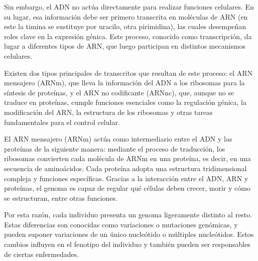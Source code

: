 \documentclass[11pt,spanish,listoffigures,listoftables]{tfgetsinf}
\begin{document}
Sin embargo, el ADN no actúa directamente para realizar funciones celulares. En su lugar, esa información debe ser primero transcrita en moléculas de ARN (en este la timina se sustituye por uracilo, otra pirimidina), las cuales desempeñan roles clave en la expresión génica. Este proceso, conocido como transcripción, da lugar a diferentes tipos de ARN, que luego participan en distintos mecanismos celulares.

Existen dos tipos principales de transcritos que resultan de este proceso: el ARN mensajero (ARNm), que lleva la información del ADN a los ribosomas para la síntesis de proteínas, y el ARN no codificante (ARNnc), que, aunque no se traduce en proteínas, cumple funciones esenciales como la regulación génica, la modificación del ARN, la estructura de los ribosomas y otras tareas fundamentales para el control celular\cite[p.~254-300]{WAT}. 

El ARN mensajero (ARNm) actúa como intermediario entre el ADN y las proteínas de la siguiente manera: mediante el proceso de traducción, los ribosomas convierten cada molécula de ARNm en una proteína, es decir, en una secuencia de aminoácidos. Cada proteína adopta una estructura tridimensional compleja y funciones específicas. Gracias a la interacción entre el ADN, ARN y proteínas, el genoma es capaz de regular qué células deben crecer, morir y cómo se estructuran, entre otras funciones\cite{RIN}. 


Por esta razón, cada individuo presenta un genoma ligeramente distinto al resto. Estas diferencias son conocidas como variaciones o mutaciones genómicas, y pueden suponer variaciones de un único nucleótido o múltiples nucleótidos. Estos cambios influyen en el fenotipo del individuo y también pueden ser responsables de ciertas enfermedades. 
\end{document}
